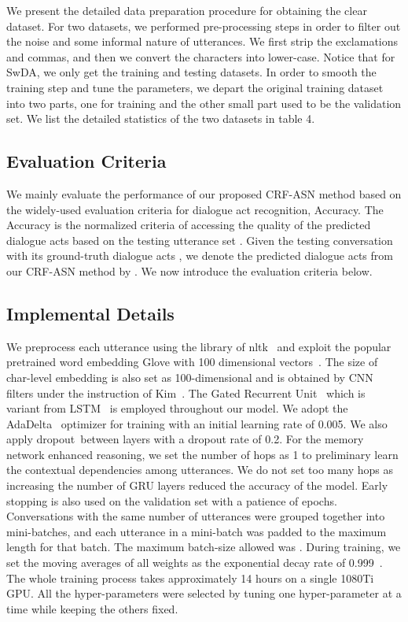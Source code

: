\documentclass[sigconf]{acmart}
\begin{document}
We present the detailed data preparation procedure for obtaining the clear dataset. For two datasets, we performed pre-processing steps in order to filter out the noise and some informal nature of utterances. We first strip the exclamations and commas, and then we convert the characters into lower-case. Notice that for SwDA, we only get the training and testing datasets. In order to smooth the training step and tune the parameters, we depart the original training dataset into two parts, one for training and the other small part used to be the validation set. We list the detailed statistics of the two datasets in table 4. 

\subsection{Evaluation Criteria}
We mainly evaluate the performance of our proposed CRF-ASN method based on the  widely-used evaluation criteria for dialogue act recognition, Accuracy. The Accuracy is the normalized criteria of accessing the quality of the predicted dialogue acts based on the testing utterance set . Given the testing conversation  with its ground-truth dialogue acts , we denote the predicted dialogue acts from our CRF-ASN method by . We now introduce the evaluation criteria below.


\subsection{Implemental Details}
We preprocess each utterance using the library of nltk~\cite{loper2002nltk} and exploit the popular pretrained word embedding Glove with 100 dimensional vectors~\cite{pennington2014glove}. The size of char-level embedding is also set as 100-dimensional and is obtained by CNN filters under the instruction of Kim~\cite{kim2016character}. The Gated Recurrent Unit~\cite{cho2014properties} which is variant from LSTM~\cite{hochreiter1997long} is employed throughout our model. We adopt the AdaDelta~\cite{zeileradadelta} optimizer for training with an initial learning rate of 0.005. We also apply  dropout~\cite{srivastava2014dropout}between layers with a dropout rate of 0.2. For the memory network enhanced reasoning, we set the number of hops as 1 to preliminary learn the contextual dependencies among utterances. We do not set too many hops as increasing the number of GRU layers reduced the accuracy of the model. Early stopping is also used on the validation set with a patience of  epochs. Conversations with the same number of utterances were grouped together into mini-batches, and each utterance in a mini-batch was padded to the maximum length for that batch. The maximum batch-size allowed was . During training, we set the moving averages of all weights as the exponential decay rate of 0.999~\cite{lucas1990exponentially}. The whole training process takes approximately 14 hours on a single 1080Ti GPU. All the hyper-parameters were selected by tuning one hyper-parameter at a time while keeping the others fixed. 
\end{document}
